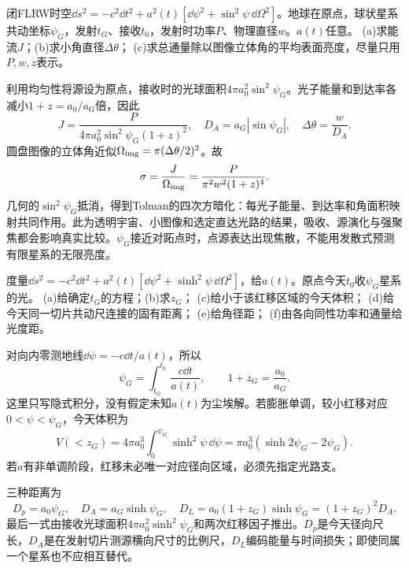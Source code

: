 \begin{exercise}
闭FLRW时空$\dd s^2=-c^2\dd t^2+a^2(t)[\dd\psi^2+\sin^2\psi\,\dd\Omega^2]$。地球在原点，球状星系共动坐标$\psi_G$，发射$t_G$、接收$t_0$，发射时功率$P$、物理直径$w$。$a(t)$任意。
(a)求能流$J$；(b)求小角直径$\Delta\theta$；
(c)求总通量除以图像立体角的平均表面亮度，尽量只用$P,w,z$表示。
\end{exercise}
\begin{solution}
利用均匀性将源设为原点，接收时的光球面积$4\pi a_0^2\sin^2\psi_G$。光子能量和到达率各减小$1+z=a_0/a_G$倍，因此
\[
 J=\frac P{4\pi a_0^2\sin^2\psi_G(1+z)^2},\quad
 D_A=a_G|\sin\psi_G|,\quad
 \Delta\theta=\frac w{D_A}.
\]
圆盘图像的立体角近似$\Omega_{\rm img}=\pi(\Delta\theta/2)^2$。故
\[
 \sigma=\frac J{\Omega_{\rm img}}
 =\frac P{\pi^2w^2(1+z)^4}.
\]
几何的$\sin^2\psi_G$抵消，得到Tolman的四次方暗化：每光子能量、到达率和角面积映射共同作用。此为透明宇宙、小图像和选定直达光路的结果，吸收、源演化与强聚焦都会影响真实比较。$\psi_G$接近对跖点时，点源表达出现焦散，不能用发散式预测有限星系的无限亮度。
\end{solution}

\begin{exercise}
度量$\dd s^2=-c^2\dd t^2+a^2(t)[\dd\psi^2+\sinh^2\psi\,\dd\Omega^2]$，给$a(t)$。原点今天$t_0$收$\psi_G$星系的光。
(a)给确定$t_G$的方程；(b)求$z_G$；
(c)给小于该红移区域的今天体积；
(d)给今天同一切片共动尺连接的固有距离；
(e)给角径距；
(f)由各向同性功率和通量给光度距。
\end{exercise}
\begin{solution}
对向内零测地线$\dd\psi=-c\dd t/a(t)$，所以
\[
 \psi_G=\int_{t_G}^{t_0}\frac{c\dd t}{a(t)},\qquad
 1+z_G=\frac{a_0}{a_G}.
\]
这里只写隐式积分，没有假定未知$a(t)$为尘埃解。若膨胀单调，较小红移对应$0<\psi<\psi_G$，今天体积为
\[
 V(<z_G)=4\pi a_0^3\int_0^{\psi_G}\sinh^2\psi\,\dd\psi
 =\pi a_0^3(\sinh2\psi_G-2\psi_G).
\]
若$a$有非单调阶段，红移未必唯一对应径向区域，必须先指定光路支。

三种距离为
\[
 D_p=a_0\psi_G,\quad D_A=a_G\sinh\psi_G,\quad
 D_L=a_0(1+z_G)\sinh\psi_G=(1+z_G)^2D_A.
\]
最后一式由接收光球面积$4\pi a_0^2\sinh^2\psi_G$和两次红移因子推出。$D_p$是今天径向尺长，$D_A$是在发射切片测源横向尺寸的比例尺，$D_L$编码能量与时间损失；即使同属一个星系也不应相互替代。
\end{solution}

